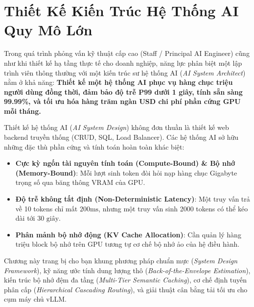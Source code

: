 
\chapter{Thiết Kế Kiến Trúc Hệ Thống AI Quy Mô Lớn}
\label{ch:ai-system-design}

Trong quá trình phỏng vấn kỹ thuật cấp cao (Staff / Principal AI Engineer) cũng như khi thiết kế hạ tầng thực tế cho doanh nghiệp, năng lực phân biệt một lập trình viên thông thường với một kiến trúc sư hệ thống AI (\textit{AI System Architect}) nằm ở khả năng: \textbf{Thiết kế một hệ thống AI phục vụ hàng chục triệu người dùng đồng thời, đảm bảo độ trễ P99 dưới 1 giây, tính sẵn sàng 99.99\%, và tối ưu hóa hàng trăm ngàn USD chi phí phần cứng GPU mỗi tháng.}

Thiết kế hệ thống AI (\textit{AI System Design}) không đơn thuần là thiết kế web backend truyền thống (CRUD, SQL, Load Balancer). Các hệ thống AI sở hữu những đặc thù phần cứng và tính toán hoàn toàn khác biệt:
\begin{itemize}
  \item \textbf{Cực kỳ ngốn tài nguyên tính toán (Compute-Bound) \& Bộ nhớ (Memory-Bound)}: Mỗi lượt sinh token đòi hỏi nạp hàng chục Gigabyte trọng số qua băng thông VRAM của GPU.
  \item \textbf{Độ trễ không tất định (Non-Deterministic Latency)}: Một truy vấn trả về 10 tokens chỉ mất $200\text{ms}$, nhưng một truy vấn sinh 2000 tokens có thể kéo dài tới $30\text{ giây}$.
  \item \textbf{Phân mảnh bộ nhớ động (KV Cache Allocation)}: Cần quản lý hàng triệu block bộ nhớ trên GPU tương tự cơ chế bộ nhớ ảo của hệ điều hành.
\end{itemize}

Chương này trang bị cho bạn khung phương pháp chuẩn mực (\textit{System Design Framework}), kỹ năng ước tính dung lượng thô (\textit{Back-of-the-Envelope Estimation}), kiến trúc bộ nhớ đệm đa tầng (\textit{Multi-Tier Semantic Caching}), cơ chế định tuyến phân cấp (\textit{Hierarchical Cascading Routing}), và giải thuật cân bằng tải tối ưu cho cụm máy chủ vLLM.

